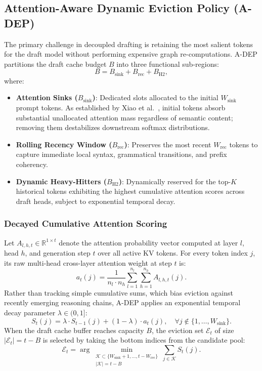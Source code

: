 \documentclass[runningheads]{llncs}
\begin{document}
\subsection{Attention-Aware Dynamic Eviction Policy (A-DEP)}
The primary challenge in decoupled drafting is retaining the most salient tokens for the draft model without performing expensive graph re-computations. A-DEP partitions the draft cache budget $B$ into three functional sub-regions:
\begin{equation}
    B = B_{\text{sink}} + B_{\text{rec}} + B_{\text{H2}},
\end{equation}
where:
\begin{itemize}
    \item \textbf{Attention Sinks ($B_{\text{sink}}$)}: Dedicated slots allocated to the initial $W_{\text{sink}}$ prompt tokens. As established by Xiao et al.~\cite{xiao2024efficient}, initial tokens absorb substantial unallocated attention mass regardless of semantic content; removing them destabilizes downstream softmax distributions.
    \item \textbf{Rolling Recency Window ($B_{\text{rec}}$)}: Preserves the most recent $W_{\text{rec}}$ tokens to capture immediate local syntax, grammatical transitions, and prefix coherency.
    \item \textbf{Dynamic Heavy-Hitters ($B_{\text{H2}}$)}: Dynamically reserved for the top-$K$ historical tokens exhibiting the highest cumulative attention scores across draft heads, subject to exponential temporal decay.
\end{itemize}

\subsubsection{Decayed Cumulative Attention Scoring}
Let $A_{l, h, t} \in \mathbb{R}^{1 \times t}$ denote the attention probability vector computed at layer $l$, head $h$, and generation step $t$ over all active KV tokens. For every token index $j$, its raw multi-head cross-layer attention weight at step $t$ is:
\begin{equation}
    a_t(j) = \frac{1}{n_l \cdot n_h} \sum_{l=1}^{n_l} \sum_{h=1}^{n_h} A_{l, h, t}(j).
\end{equation}
Rather than tracking simple cumulative sums, which bias eviction against recently emerging reasoning chains, A-DEP applies an exponential temporal decay parameter $\lambda \in (0, 1]$:
\begin{equation}
    S_t(j) = \lambda \cdot S_{t-1}(j) + (1 - \lambda) \cdot a_t(j), \quad \forall j \notin \{1, \dots, W_{\text{sink}}\}.
\end{equation}
When the draft cache buffer reaches capacity $B$, the eviction set $\mathcal{E}_t$ of size $|\mathcal{E}_t| = t - B$ is selected by taking the bottom indices from the candidate pool:
\begin{equation}
    \mathcal{E}_t = \arg\min_{\substack{\mathcal{K} \subset \{W_{\text{sink}}+1, \dots, t - W_{\text{rec}}\} \\ |\mathcal{K}| = t - B}} \sum_{j \in \mathcal{K}} S_t(j).
\end{equation}
\end{document}
